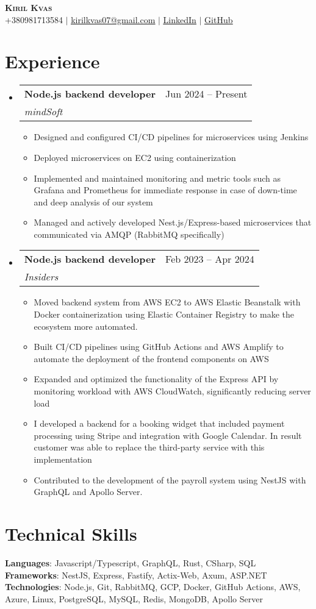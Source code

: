 \documentclass[letterpaper,11pt]{article}
\makeatletter
\newcommand{\resumeItem}[1]{
  \item\small{
    {#1 \vspace{-2pt}}
  }
}
\newcommand{\resumeSubheading}[4]{
  \vspace{-2pt}\item
    \begin{tabular*}{0.97\textwidth}[t]{l@{\extracolsep{\fill}}r}
      \textbf{#1} & #2 \\
      \textit{\small#3} & \textit{\small #4} \\
    \end{tabular*}\vspace{-7pt}
}
\newcommand{\resumeSubHeadingListStart}{\begin{itemize}[leftmargin=0.15in, label={}]}
\newcommand{\resumeSubHeadingListEnd}{\end{itemize}}
\newcommand{\resumeItemListStart}{\begin{itemize}}
\newcommand{\resumeItemListEnd}{\end{itemize}\vspace{-5pt}}
\makeatother
\begin{document}
\begin{center}
    \textbf{\Huge \scshape Kiril Kvas} \\ \vspace{1pt}
    \small +380981713584 $|$ \href{mailto:kirilkvas07@gmail.com}{\underline{kirilkvas07@gmail.com}} $|$ 
    \href{https://www.linkedin.com/in/kiril-kvas-999154239/}{\underline{LinkedIn}} $|$
    \href{https://github.com/rillsvai}{\underline{GitHub}}
\end{center}

\section{Experience}
\resumeSubHeadingListStart
    \resumeSubheading
      {Node.js backend developer}{Jun 2024 -- Present}
      {mindSoft}{}
      \resumeItemListStart
        \resumeItem{Designed and configured CI/CD pipelines for microservices using Jenkins}
        \resumeItem{Deployed microservices on EC2 using containerization}
        \resumeItem{Implemented and maintained monitoring and metric tools such as Grafana and Prometheus for immediate response in case of down-time and deep analysis of our system}
        \resumeItem{Managed and actively developed Nest.js/Express-based microservices that communicated via AMQP (RabbitMQ specifically)}
      \resumeItemListEnd
  \resumeSubHeadingListEnd
  \resumeSubHeadingListStart
    \resumeSubheading
      {Node.js backend developer}{Feb 2023 -- Apr 2024}
      {Insiders}{}
      \resumeItemListStart
            \resumeItem{Moved backend system from AWS EC2 to AWS Elastic Beanstalk with Docker containerization using Elastic Container Registry to make the ecosystem more automated.}
            \resumeItem{Built CI/CD pipelines using GitHub Actions and AWS Amplify to automate the deployment of the frontend components on AWS }
            \resumeItem{Expanded and optimized the functionality of the Express API by monitoring workload with AWS CloudWatch, significantly reducing server load}
            \resumeItem{I developed a backend for a booking widget that included payment processing using Stripe and integration with Google Calendar. In result customer was able to replace the third-party service with this implementation}
            \resumeItem{ Contributed to the development of the payroll system using NestJS with GraphQL and Apollo Server. }
      \resumeItemListEnd
  \resumeSubHeadingListEnd
  
\section{Technical Skills}
 \begin{itemize}[leftmargin=0.15in, label={}]
    \small{\item{
     \textbf{Languages}{: Javascript/Typescript, GraphQL, Rust, CSharp, SQL} \\
     \textbf{Frameworks}{: NestJS, Express, Fastify, Actix-Web, Axum, ASP.NET} \\
     \textbf{Technologies}{: Node.js, Git, RabbitMQ, GCP, Docker, GitHub Actions, AWS, Azure, Linux, PostgreSQL, MySQL, Redis, MongoDB, Apollo Server} \\
    }}
 \end{itemize}
 
\end{document}
